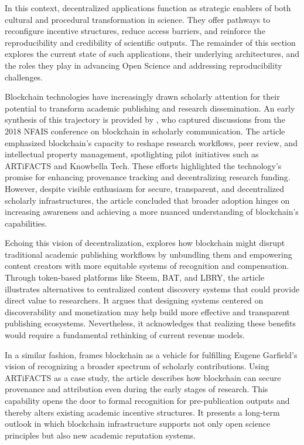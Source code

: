 \documentclass[final]{rc-book-2.14}
\begin{document}
In this context, decentralized applications function as strategic enablers of both cultural and procedural transformation in science. They offer pathways to reconfigure incentive structures, reduce access barriers, and reinforce the reproducibility and credibility of scientific outputs. The remainder of this section explores the current state of such applications, their underlying architectures, and the roles they play in advancing Open Science and addressing reproducibility challenges.

Blockchain technologies have increasingly drawn scholarly attention for their potential to transform academic publishing and research dissemination. An early synthesis of this trajectory is provided by \cite{lawlor_overview_2018}, who captured discussions from the 2018 NFAIS conference on blockchain in scholarly communication. The article emphasized blockchain’s capacity to reshape research workflows, peer review, and intellectual property management, spotlighting pilot initiatives such as ARTiFACTS and Knowbella Tech. These efforts highlighted the technology’s promise for enhancing provenance tracking and decentralizing research funding. However, despite visible enthusiasm for secure, transparent, and decentralized scholarly infrastructures, the article concluded that broader adoption hinges on increasing awareness and achieving a more nuanced understanding of blockchain’s capabilities.

Echoing this vision of decentralization, \cite{holmen_blockchain_2018} explores how blockchain might disrupt traditional academic publishing workflows by unbundling them and empowering content creators with more equitable systems of recognition and compensation. Through token-based platforms like Steem, BAT, and LBRY, the article illustrates alternatives to centralized content discovery systems that could provide direct value to researchers. It argues that designing systems centered on discoverability and monetization may help build more effective and transparent publishing ecosystems. Nevertheless, it acknowledges that realizing these benefits would require a fundamental rethinking of current revenue models.

In a similar fashion, \cite{kochalko_making_2019} frames blockchain as a vehicle for fulfilling Eugene Garfield’s vision of recognizing a broader spectrum of scholarly contributions. Using ARTiFACTS as a case study, the article describes how blockchain can secure provenance and attribution even during the early stages of research. This capability opens the door to formal recognition for pre-publication outputs and thereby alters existing academic incentive structures. It presents a long-term outlook in which blockchain infrastructure supports not only open science principles but also new academic reputation systems.
\end{document}

